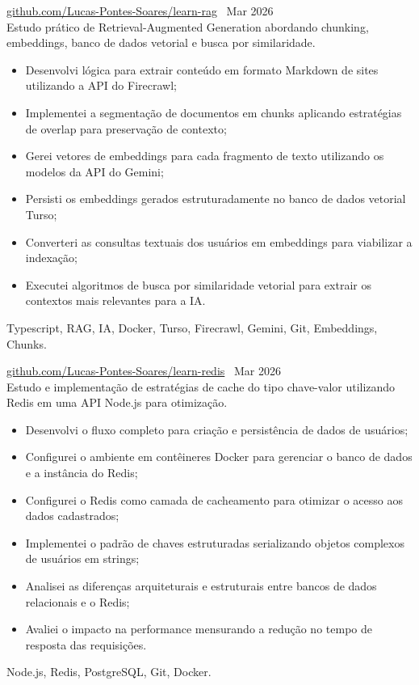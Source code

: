         
 \textbar{}  \href{https://github.com/Lucas-Pontes-Soares/learn-rag}{github.com/Lucas-Pontes-Soares/learn-rag} \hfill\ Mar 2026 \\
Estudo prático de Retrieval-Augmented Generation abordando chunking, embeddings, banco de dados vetorial e busca por similaridade.
\begin{itemize}
    \item Desenvolvi lógica para extrair conteúdo em formato Markdown de sites utilizando a API do Firecrawl;
    \item Implementei a segmentação de documentos em chunks aplicando estratégias de overlap para preservação de contexto;
    \item Gerei vetores de embeddings para cada fragmento de texto utilizando os modelos da API do Gemini;
    \item Persisti os embeddings gerados estruturadamente no banco de dados vetorial Turso;
    \item Converteri as consultas textuais dos usuários em embeddings para viabilizar a indexação;
    \item Executei algoritmos de busca por similaridade vetorial para extrair os contextos mais relevantes para a IA.
\end{itemize}
 Typescript, RAG, IA, Docker, Turso, Firecrawl, Gemini, Git, Embeddings, Chunks.

        
 \textbar{}  \href{https://github.com/Lucas-Pontes-Soares/learn-redis}{github.com/Lucas-Pontes-Soares/learn-redis} \hfill\ Mar 2026 \\
Estudo e implementação de estratégias de cache do tipo chave-valor utilizando Redis em uma API Node.js para otimização.
\begin{itemize}
    \item Desenvolvi o fluxo completo para criação e persistência de dados de usuários;
    \item Configurei o ambiente em contêineres Docker para gerenciar o banco de dados e a instância do Redis;
    \item Configurei o Redis como camada de cacheamento para otimizar o acesso aos dados cadastrados;
    \item Implementei o padrão de chaves estruturadas serializando objetos complexos de usuários em strings;
    \item Analisei as diferenças arquiteturais e estruturais entre bancos de dados relacionais e o Redis;
    \item Avaliei o impacto na performance mensurando a redução no tempo de resposta das requisições.
\end{itemize}
 Node.js, Redis, PostgreSQL, Git, Docker.

